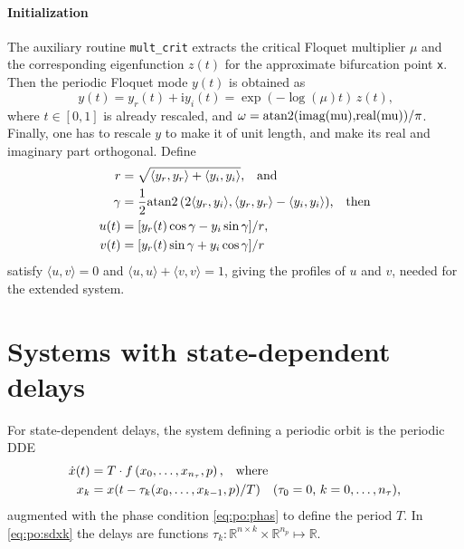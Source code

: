 \documentclass[11pt]{scrartcl}
\newcommand{\mt}[1]{\mathrm{#1}}
\renewcommand{\i}{\mt{i}}
\newcommand{\R}{\mathbb{R}}
\newcommand{\blist}[1]{\mbox{\lstinline!#1!}}
\begin{document}
\paragraph{Initialization}
The auxiliary routine \blist{mult_crit} extracts the critical Floquet
multiplier $\mu$ and the corresponding eigenfunction $z(t)$ for the
approximate bifurcation point \blist{x}. Then the periodic Floquet
mode $y(t)$ is obtained as
\begin{displaymath}
y(t)=y_r(t)+\i y_i(t)=\exp(-\log(\mu)t)\,z(t)\mbox{,}
\end{displaymath}
where $t\in[0,1]$ is already rescaled, and
$\omega=\blist{atan2(imag(mu),real(mu))}/\pi$. Finally, one has to
rescale $y$ to make it of unit length, and make its real and imaginary
part orthogonal. Define
\begin{align*}
  r&=\sqrt{\langle y_r,y_r\rangle+\langle
    y_i,y_i\rangle}\mbox{,\quad and }\\
  \gamma&=\frac{1}{2}\blist{atan2}\,(2\langle
  y_r,y_i\rangle,\langle
  y_r,y_r\rangle-\langle y_i,y_i\rangle)\mbox{,\quad then}\\
  u(t)&=[y_r(t)\cos\gamma-y_i\sin\gamma]/r\mbox{,}\\
  v(t)&=[y_r(t)\sin\gamma+y_i\cos\gamma]/r
\end{align*}
satisfy $\langle u,v\rangle=0$ and $\langle u,u\rangle+\langle
v,v\rangle=1$, giving the profiles of $u$ and $v$, needed for the
extended system.

\section{Systems with state-dependent delays}
\label{sec:sd-dde}
For state-dependent delays, the system defining a periodic orbit is
the periodic DDE 
\begin{align}
  \label{eq:po:sddde}
  \dot x(t)&=T\cdot f\left(x_0,\ldots,x_{n_\tau},p\right)\mbox{,\quad where}\\
  x_k&=x(t-\tau_k(x_0,\ldots,x_{k-1},p)/T)\mbox{\quad ($\tau_0=0$,
    $k=0,\ldots,n_\tau$),}
  \label{eq:po:sdxk}
\end{align}
augmented with the phase condition \eqref{eq:po:phas} to define the
period $T$. In \eqref{eq:po:sdxk} the delays are functions
$\tau_k:\R^{n\times k}\times\R^{n_p}\mapsto\R$.
\end{document}
